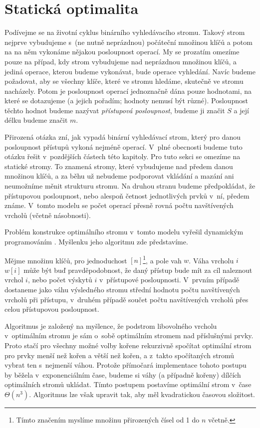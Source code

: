 \section{Statická optimalita}\label{sec:staticoptimality}

Podívejme se na životní cyklus binárního vyhledávacího stromu. Takový strom
nejprve vybudujeme s~(ne nutně neprázdnou) počáteční množinou klíčů
a potom na na něm vykonáme nějakou posloupnost operací. My se prozatím omezíme
pouze na případ, kdy strom vybudujeme nad neprázdnou množinou klíčů, a jediná
operace, kterou budeme vykonávat, bude operace vyhledání. Navíc budeme
požadovat, aby se všechny klíče, které ve stromu hledáme, skutečně ve stromu nacházely.
Potom je posloupnost operací jednoznačně dána pouze hodnotami, na které se
dotazujeme (a jejich pořadím; hodnoty nemusí být různé). Posloupnost těchto
hodnot budeme nazývat \emph{přístupová posloupnost}, budeme ji značit $S$ a
její délku budeme značit $m$.

Přirozená otázka zní, jak vypadá binární vyhledávací strom, který pro danou
posloupnost přístupů vykoná nejméně operací. V~plné obecnosti budeme tuto otázku řešit v~pozdějších částech této kapitoly. Pro tuto sekci se omezíme na statické
stromy. To znamená stromy, které vybudujeme nad předem danou množinou klíčů, a
za běhu už nebudeme podporovat vkládání a mazání ani neumožníme měnit
strukturu stromu. Na druhou stranu budeme předpokládat, že přístupovou posloupnost, nebo alespoň četnost jednotlivých prvků v~ní, předem známe. V~tomto modelu se počet operací přesně rovná
počtu navštívených vrcholů (včetně násobnosti).

Problém konstrukce optimálního stromu v~tomto modelu vyřešil dynamickým
programováním \citet{staticoptimality}. Myšlenku jeho algoritmu zde představíme.

Mějme množinu klíčů, pro jednoduchost $[n]$\footnote{Tímto značením myslíme
množinu přirozených čísel od 1 do $n$ včetně.}, a pole vah $w$. Váha vrcholu
$i$ $w[i]$ může být buď pravděpodobnost, že daný přístup bude mít za
cíl naleznout vrchol $i$, nebo počet výskytů $i$ v~přístupové
posloupnosti. V~prvním případě dostaneme jako váhu výsledného stromu střední
hodnotu počtu navštívených vrcholů při přístupu, v~druhém případě součet počtu navštívených vrcholů přes
celou přístupovou posloupnost.

Algoritmus je založený na myšlence, že podstrom libovolného vrcholu
v~optimálním stromu je sám o~sobě optimálním stromem nad příslušnými prvky. Proto
stačí pro všechny možné volby kořene rekurzivně spočítat optimální strom pro
prvky menší než kořen a větší než kořen, a z~takto spočítaných stromů vybrat
ten s~nejmenší váhou. Protože přímočará implementace tohoto postupu by běžela
v~exponenciálním čase, budeme si váhy (a případně kořeny) dílčích optimálních
stromů ukládat. Tímto postupem postavíme optimální strom
v~čase $\Theta(n^3)$. Algoritmus lze však upravit tak, aby měl kvadratickou časovou složitost.



